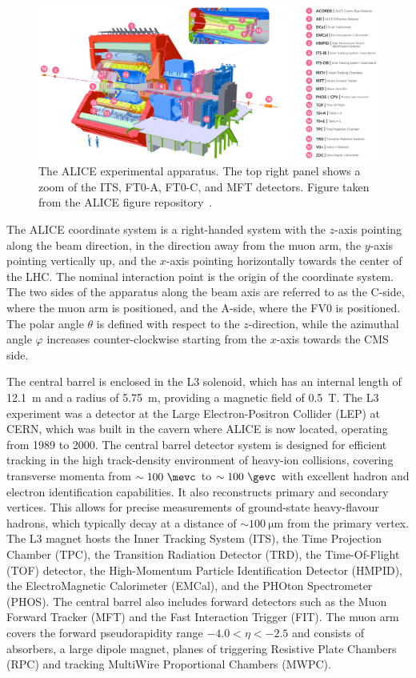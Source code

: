 \begin{figure}
    \centering
    \includegraphics[width=\textwidth]{Figures/Chapter 3/ALICE_Scheme.png}
    \caption{The ALICE experimental apparatus. The top right panel shows a zoom of the ITS, FT0-A, FT0-C, and MFT detectors. Figure taken from the ALICE figure repository~\cite{ALICE_figures}.}
    \label{fig:ALICE}
\end{figure}

The ALICE coordinate system is a right-handed system with the $z$-axis pointing along the beam direction, in the direction away from the muon arm, the $y$-axis pointing vertically up, and the $x$-axis pointing horizontally towards the center of the LHC. The nominal interaction point is the origin of the coordinate system. The two sides of the apparatus along the beam axis are referred to as the C-side, where the muon arm is positioned, and the A-side, where the FV0 is positioned. The polar angle $\theta$ is defined with respect to the $z$-direction, while the azimuthal angle $\varphi$ increases counter-clockwise
starting from the $x$-axis towards the CMS side.


The central barrel is enclosed in the L3 solenoid, which has an internal length of 12.1~m and a radius of 5.75~m, providing a magnetic field of 0.5~T. The L3 experiment was a detector at the Large Electron-Positron Collider (LEP) at CERN, which was built in the cavern where ALICE is now located, operating from 1989 to 2000. The central barrel detector system is designed for efficient tracking in the high track-density environment of heavy-ion collisions, covering transverse momenta from $\sim100~\mevc$ to $\sim100~\gevc$ with excellent hadron and electron identification capabilities. It also reconstructs primary and secondary vertices. This allows for precise measurements of ground-state heavy-flavour hadrons, which typically decay at a distance of $\sim\SI{100}{\micro\meter}$ from the primary vertex. The L3 magnet hosts the Inner Tracking System (ITS), the Time Projection Chamber (TPC), the Transition Radiation Detector (TRD), the Time-Of-Flight (TOF) detector, the High-Momentum Particle Identification Detector (HMPID), the ElectroMagnetic Calorimeter (EMCal), and the PHOton Spectrometer (PHOS). The central barrel also includes forward detectors such as the Muon Forward Tracker (MFT) and the Fast Interaction Trigger (FIT). The muon arm covers the forward pseudorapidity range $-4.0 < \eta < -2.5$ and consists of absorbers, a large dipole magnet, planes of triggering Resistive Plate Chambers (RPC) and tracking MultiWire Proportional Chambers (MWPC).

